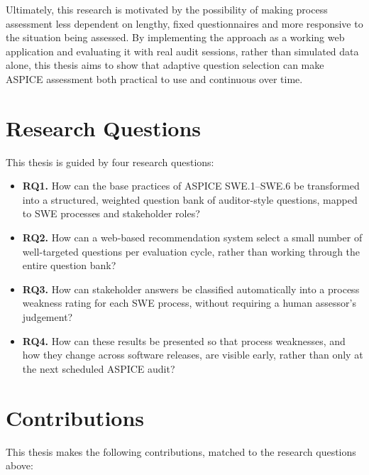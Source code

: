 \documentclass[a4paper, 12pt, oneside, openany, BCOR1cm,toc=chapterentrywithdots]{scrbook}
\begin{document}
Ultimately, this research is motivated by the possibility of making process assessment less
dependent on lengthy, fixed questionnaires and more responsive to the situation being assessed.
By implementing the approach as a working web application and evaluating it with real audit
sessions, rather than simulated data alone, this thesis aims to show that adaptive question
selection can make ASPICE assessment both practical to use and continuous over time.

\section{Research Questions}

This thesis is guided by four research questions:

\begin{itemize}
  \item \textbf{RQ1.} How can the base practices of ASPICE SWE.1--SWE.6 be transformed into a
  structured, weighted question bank of auditor-style questions, mapped to SWE processes and
  stakeholder roles?
  \item \textbf{RQ2.} How can a web-based recommendation system select a small number of
  well-targeted questions per evaluation cycle, rather than working through the entire question
  bank?
  \item \textbf{RQ3.} How can stakeholder answers be classified automatically into a process
  weakness rating for each SWE process, without requiring a human assessor's judgement?
  \item \textbf{RQ4.} How can these results be presented so that process weaknesses, and how
  they change across software releases, are visible early, rather than only at the next
  scheduled ASPICE audit?
\end{itemize}

\section{Contributions}

This thesis makes the following contributions, matched to the research questions above:
\end{document}
